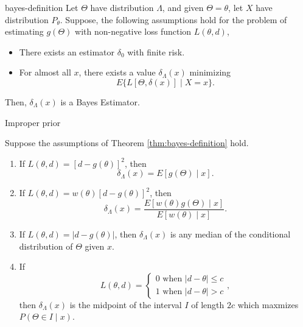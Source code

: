 \begin{theorem}{}{bayes-definition}
    Let $\Theta$ have distribution $\Lambda$, and given $\Theta=\theta$, let $X$ have distribution $P_{\theta}$. Suppose, the following assumptions hold for the problem of estimating $g\left(\Theta\right)$ with non-negative loss function $L\left(\theta,d\right)$,
    \begin{itemize}
        \item There exists an estimator $\delta_0$ with finite risk.
        \item For almost all $x$, there exists a value $\delta_{\Lambda}\left(x\right)$ minimizing
        \begin{equation}
            E\{L[\Theta,\delta\left(x\right)] \mid X=x\}.
        \end{equation}
    \end{itemize}
    Then, $\delta_{\Lambda}\left(x\right)$ is a Bayes Estimator.
\end{theorem}
\begin{note}
    Improper prior
\end{note}

\begin{corollary}{}{}
    Suppose the assumptions of Theorem \ref{thm:bayes-definition} hold.
    \begin{enumerate}
        \item If $L\left(\theta,d\right)=[d-g\left(\theta\right)]^2$, then
        \begin{equation}
            \delta_{\Lambda}\left(x\right)=E[g\left(\Theta\right) \mid x].
        \end{equation}
        \item If $L\left(\theta,d\right)=w\left(\theta\right)[d-g\left(\theta\right)]^2$, then
        \begin{equation}
            \delta_{\Lambda}\left(x\right)=\frac{E[w\left(\theta\right)g\left(\Theta\right) \mid x]}{E[w\left(\theta\right) \mid x]}.
        \end{equation}
        \item If $L\left(\theta,d\right)=|d-g\left(\theta\right)|$, then $\delta_\Lambda\left(x\right)$ is any median of the conditional distribution of $\Theta$ given $x$.
        \item If
        \begin{equation*}
            L(\theta, d)=\left\{
                \begin{array}{l}
                    0 \text { when }|d-\theta| \leq c \\
                    1 \text { when }|d-\theta|>c
                \end{array}
            \right.,
        \end{equation*}
        then $\delta_\Lambda\left(x\right)$ is the midpoint of the interval $I$ of length $2c$ which maxmizes $P\left(\Theta\in I\mid x\right)$.
    \end{enumerate}
\end{corollary}

